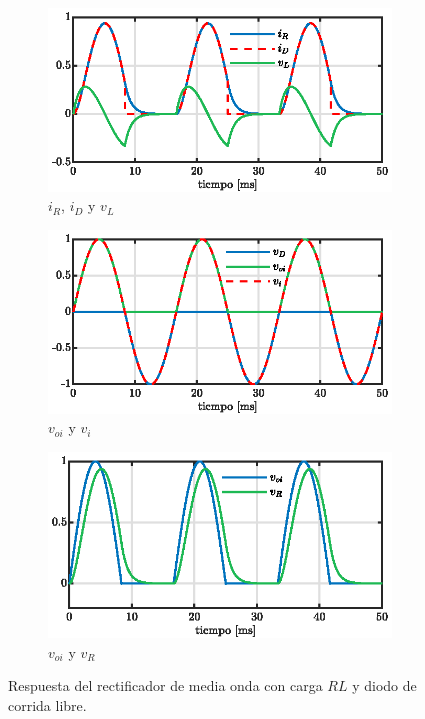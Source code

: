 \documentclass[conference]{IEEEtran}
\begin{document}
\begin{figure}[ht]
  \centering
  \begin{subfigure}[t]{0.5\textwidth}
    \centering
    \includegraphics[width=\linewidth]{figuras/ir_id_vl.eps}
    \caption{$i_R$, $i_D$ y $v_L$}
    \label{fig:ir-id-vl}
  \end{subfigure}\hfill
  \begin{subfigure}[t]{0.5\textwidth}
    \centering
    \includegraphics[width=\linewidth]{figuras/voi_vi.eps}
    \caption{$v_{oi}$ y $v_i$}
    \label{fig:voi-vi}
  \end{subfigure}\hfill
  \begin{subfigure}[t]{0.5\textwidth}
    \centering
    \includegraphics[width=\linewidth]{figuras/voi_vr.eps}
    \caption{$v_{oi}$ y $v_R$}
    \label{fig:voi-vr}
  \end{subfigure}
  \caption{Respuesta del rectificador de media onda con carga $RL$ y diodo de corrida libre.}
  \label{fig:rectificador-subfigs}
\end{figure}
\end{document}
